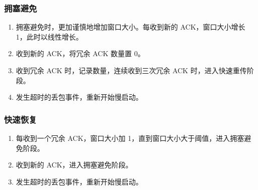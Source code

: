 \documentclass[UTF8,a4paper,10pt]{ctexart}
\begin{document}
\subsubsection{拥塞避免}
\begin{enumerate}
  \item 拥塞避免时，更加谨慎地增加窗口大小。每收到新的 ACK，窗口大小增长 1，此时以线性增长。
  \item 收到新的 ACK，将冗余 ACK 数量置 0。
  \item 收到冗余 ACK 时，记录数量，连续收到三次冗余 ACK 时，进入快速重传阶段。
  \item 发生超时的丢包事件，重新开始慢启动。
\end{enumerate}
\subsubsection{快速恢复}
\begin{enumerate}
  \item 每收到一个冗余 ACK，窗口大小加 1，直到窗口大小大于阈值，进入拥塞避免阶段。
  \item 收到新的 ACK，进入拥塞避免阶段。
  \item  发生超时的丢包事件，重新开始慢启动。
\end{enumerate}
\end{document}
